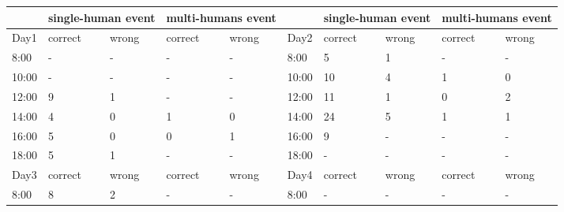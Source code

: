 \begin{table}[]
\small
\begin{tabular}{l|ll|ll|l|ll|ll|}
\cline{2-5} \cline{7-10}
                            & \multicolumn{2}{l|}{single-human event} & \multicolumn{2}{l|}{multi-humans event} &       & \multicolumn{2}{l|}{single-human event} & \multicolumn{2}{l|}{multi-humans event} \\ \hline
\multicolumn{1}{|l|}{Day1}  & correct             & wrong             & correct             & wrong             & Day2  & correct             & wrong             & correct             & wrong             \\ \hline
\multicolumn{1}{|l|}{8:00}  & -                   & -                 & -                   & -                 & 8:00  & 5                   & 1                 & -                   & -                 \\
\multicolumn{1}{|l|}{10:00} & -                   & -                 & -                   & -                 & 10:00 & 10                  & 4                 & 1                   & 0                 \\
\multicolumn{1}{|l|}{12:00} & 9                   & 1                 & -                   & -                 & 12:00 & 11                  & 1                 & 0                   & 2                 \\
\multicolumn{1}{|l|}{14:00} & 4                   & 0                 & 1                   & 0                 & 14:00 & 24                  & 5                 & 1                   & 1                 \\
\multicolumn{1}{|l|}{16:00} & 5                   & 0                 & 0                   & 1                 & 16:00 & 9                   & -                 & -                   & -                 \\
\multicolumn{1}{|l|}{18:00} & 5                   & 1                 & -                   & -                 & 18:00 & -                   & -                 & -                   & -                 \\ \hline
\multicolumn{1}{|l|}{Day3}  & correct             & wrong             & correct             & wrong             & Day4  & correct             & wrong             & correct             & wrong             \\ \hline
\multicolumn{1}{|l|}{8:00}  & 8                   & 2                 & -                   & -                 & 8:00  & -                   & -                 & -                   & -                 \\

\end{tabular}
\end{table}
